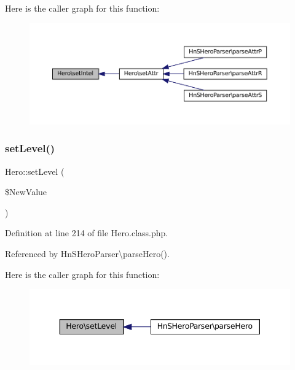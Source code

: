Here is the caller graph for this function\+:\nopagebreak
\begin{figure}[H]
\begin{center}
\leavevmode
\includegraphics[width=350pt]{class_hero_a460f54cd686a39877ea25d4ba9ef27f2_icgraph}
\end{center}
\end{figure}
\mbox{\label{class_hero_a193167bb9c4a6410d44511f042660bf3}} 
\subsubsection{\texorpdfstring{set\+Level()}{setLevel()}}
{\footnotesize\ttfamily Hero\+::set\+Level (\begin{DoxyParamCaption}\item[{}]{\$\+New\+Value }\end{DoxyParamCaption})}



Definition at line 214 of file Hero.\+class.\+php.



Referenced by Hn\+S\+Hero\+Parser\textbackslash{}parse\+Hero().

Here is the caller graph for this function\+:\nopagebreak
\begin{figure}[H]
\begin{center}
\leavevmode
\includegraphics[width=343pt]{class_hero_a193167bb9c4a6410d44511f042660bf3_icgraph}
\end{center}
\end{figure}
\mbox{\label{class_hero_a610db717ebe7ad94233b86a637fca660}} 
